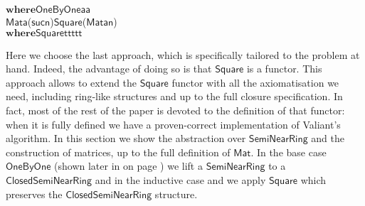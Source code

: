 \documentclass{CSML}
\numberwithin{theorem}{section}
\newcommand{\kw}[1]{\ensuremath{\mathbf{#1}}}
\newcommand{\Conid}[1]{\mathit{#1}}
\newcommand{\Varid}[1]{\mathit{#1}}
\def\resethooks{\global\let\SaveRestoreHook\empty
  \global\let\ColumnHook\empty}
\newcommand{\hsindent}[1]{\quad}\let\hspre\empty
\renewcommand\Varid[1]{\ensuremath{\mathsf{#1}}}
\renewcommand\Conid[1]{\ensuremath{\mathsf{#1}}}
\begin{document}
\begin{itemize}
\begin{hscode}
\>[5]{}\hsindent{2}{}\<[7]\>[7]{}\kw{where}\;\Conid{OneByOne}\;\Varid{a}\;\mathrel{=}\;\Varid{a}{}\<[E]\\
\>[5]{}\Conid{Mat}\;\Varid{a}\;(\Varid{suc}\;\Varid{n})\;{}\<[20]\>[20]{}\mathrel{=}\;\Conid{Square}\;(\Conid{Mat}\;\Varid{a}\;\Varid{n}){}\<[E]\\
\>[5]{}\hsindent{2}{}\<[7]\>[7]{}\kw{where}\;\Conid{Square}\;\Varid{t}\;\mathrel{=}\;\Varid{t}\;\mathbin{\!\times\!}\;\Varid{t}\;\mathbin{\!\times\!}\;\Varid{t}\;\mathbin{\!\times\!}\;\Varid{t}{}\<[E]\ColumnHook
\end{hscode}\resethooks
\end{itemize}
Here we choose the last approach, which is specifically tailored to
the problem at hand. Indeed, the advantage of doing so is that
\ensuremath{\Conid{Square}} is a functor.  This approach allows to extend the \ensuremath{\Conid{Square}}
functor with all the axiomatisation we need, including ring-like
structures and up to the full closure specification.
In fact, most of the rest of the paper is devoted to the
definition of that functor: when it is fully defined we have a
proven-correct implementation of Valiant's algorithm.
In this section we show the abstraction over \ensuremath{\Conid{SemiNearRing}} and the
construction of matrices, up to the full definition of \ensuremath{\Conid{Mat}}.
In the base case \ensuremath{\Conid{OneByOne}} (shown later in  on page \pageref{sec:OneByOne}) we
lift a \ensuremath{\Conid{SemiNearRing}} to a \ensuremath{\Conid{ClosedSemiNearRing}} and in the inductive
case and we apply \ensuremath{\Conid{Square}} which preserves the \ensuremath{\Conid{ClosedSemiNearRing}}
structure.
\end{document}

